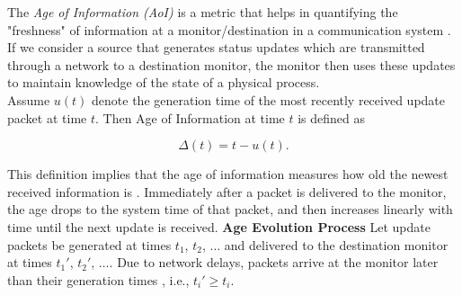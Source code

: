 \documentclass[a4paper,12pt]{article}
\begin{document}
\noindent
The \textit{Age of Information (AoI)} is a metric that helps in quantifying the "freshness" of information at a monitor/destination in a communication system \cite{9380899}. If we consider a source that generates status updates which are transmitted through a network to a destination monitor, the monitor then uses these updates to maintain knowledge of the state of a physical process.\\

\noindent
Assume $u(t)$ denote the generation time of the most recently received update packet at time $t$. Then Age of Information at time $t$ is defined as

\[
\Delta(t) = t - u(t).
\]

\noindent
This definition implies that the age of information measures how old the newest received information is \cite{9380899}. Immediately after a packet is delivered to the monitor, the age drops to the system time of that packet, and then increases linearly with time until the next update is received.
\noindent
\textbf{Age Evolution Process}
\noindent
Let update packets be generated at times $t_1$, $t_2$, $\dots$ and delivered to the destination monitor at times $t_1'$, $t_2'$, $\dots$. Due to network delays, packets arrive at the monitor later than their generation times \cite{9380899}, i.e., $t_i' \ge t_i$.
\end{document}
